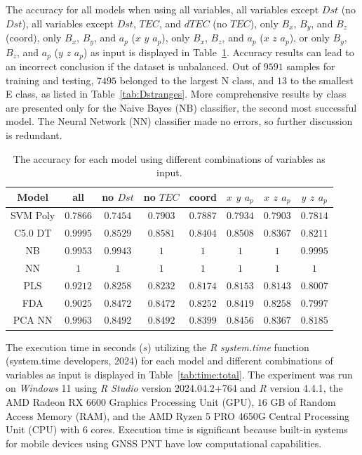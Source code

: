 \documentclass[sn-mathphys-num]{sn-jnl}%
\begin{document}
The accuracy for all models when using all variables, all variables except $Dst$ (no $Dst$), all variables except $Dst$, $TEC$, and $dTEC$ (no $TEC$), only $B_{x}$, $B_{y}$, and $B_{z}$ (coord), only $B_{x}$, $B_{y}$, and $a_{p}$ ($x$ $y$ $a_{p}$), only $B_{x}$, $B_{z}$, and $a_{p}$ ($x$ $z$ $a_{p}$), or only $B_{y}$, $B_{z}$, and $a_{p}$ ($y$ $z$ $a_{p}$) as input is displayed in Table~\ref{tab:acc:all}. Accuracy results can lead to an incorrect conclusion if the dataset is unbalanced. Out of $9591$ samples for training and testing, $7495$ belonged to the largest N class, and $13$ to the smallest E class, as listed in Table~\ref{tab:Dstranges}. More comprehensive results by class are presented only for the Naive Bayes (NB) classifier, the second most successful model. The Neural Network (NN) classifier made no errors, so further discussion is redundant.

\begin{table}[!ht]
    \centering
    \caption{The accuracy for each model using different combinations of variables as input.}
	\label{tab:acc:all}
	\begin{tabular}{|c|c|c|c|c|c|c|c|}
		\hline
		Model & all & no $Dst$ & no $TEC$ & coord & $x$ $y$ $a_{p}$ & $x$ $z$ $a_{p}$ & $y$ $z$ $a_{p}$ \\ \hline
		SVM Poly & $0.7866$ & $0.7454$ & $0.7903$ & $0.7887$ & $0.7934$ & $0.7903$ & $0.7814$ \\ \hline
		C5.0 DT & $0.9995$ & $0.8529$ & $0.8581$ & $0.8404$ & $0.8508$ & $0.8367$ & $0.8211$ \\ \hline
		NB & $0.9953$ & $0.9943$ & $1$ & $1$ & $1$ & $1$ & $0.9995$ \\ \hline
		NN & $1$ & $1$ & $1$ & $1$ & $1$ & $1$ & $1$ \\ \hline
		PLS & $0.9212$ & $0.8258$ & $0.8232$ & $0.8174$ & $0.8153$ & $0.8143$ & $0.8007$ \\ \hline
		FDA & $0.9025$ & $0.8472$ & $0.8472$ & $0.8252$ & $0.8419$ & $0.8258$ & $0.7997$ \\ \hline
		PCA NN & $0.9963$ & $0.8492$ & $0.8492$ & $0.8399$ & $0.8456$ & $0.8367$ & $0.8185$ \\ \hline
	\end{tabular}
\end{table}

The execution time in seconds ($s$) utilizing the \textit{R} \textit{system.time} function (system.time developers, 2024) for each model and different combinations of variables as input is displayed in Table~\ref{tab:time:total}. The experiment was run on \textit{Windows} 11 using \textit{R Studio} version 2024.04.2+764 and \textit{R} version 4.4.1, the AMD Radeon RX 6600 Graphics Processing Unit (GPU), $16$ GB of Random Access Memory (RAM), and the AMD Ryzen 5 PRO 4650G Central Processing Unit (CPU) with $6$ cores. Execution time is significant because built-in systems for mobile devices using GNSS PNT have low computational capabilities.
\end{document}
